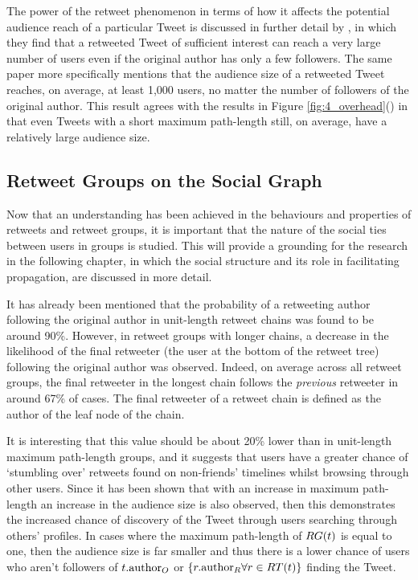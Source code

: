 The power of the retweet phenomenon in terms of how it affects the potential audience reach of a particular Tweet is discussed in further detail by \citet{kwak10}, in which they find that a retweeted Tweet of sufficient interest can reach a very large number of users even if the original author has only a few followers. The same paper more specifically mentions that the audience size of a retweeted Tweet reaches, on average, at least 1,000 users, no matter the number of followers of the original author. This result agrees with the results in Figure \ref{fig:4_overhead}() in that even Tweets with a short maximum path-length still, on average, have a relatively large audience size.


\subsection{Retweet Groups on the Social Graph}
\label{section:retweets_graph}
Now that an understanding has been achieved in the behaviours and properties of retweets and retweet groups, it is important that the nature of the social ties between users in groups is studied. This will provide a grounding for the research in the following chapter, in which the social structure and its role in facilitating propagation, are discussed in more detail.

It has already been mentioned that the probability of a retweeting author following the original author in unit-length retweet chains was found to be around 90\%. However, in retweet groups with longer chains, a decrease in the likelihood of the final retweeter (the user at the bottom of the retweet tree) following the original author was observed. Indeed, on average across all retweet groups, the final retweeter in the longest chain follows the \textit{previous} retweeter in around 67\% of cases. The final retweeter of a retweet chain is defined as the author of the leaf node of the chain.


It is interesting that this value should be about 20\% lower than in unit-length maximum path-length groups, and it suggests that users have a greater chance of `stumbling over' retweets found on non-friends' timelines whilst browsing through other users. Since it has been shown that with an increase in maximum path-length an increase in the audience size is also observed, then this demonstrates the increased chance of discovery of the Tweet through users searching through others' profiles. In cases where the maximum path-length of $RG(t)$ is equal to one, then the audience size is far smaller and thus there is a lower chance of users who aren't followers of $t.\textrm{author}_O$ or $\left\{r.\textrm{author}_R \forall r \in RT(t)\right\}$ finding the Tweet.

